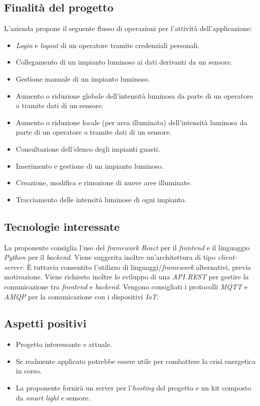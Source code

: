 \subsection{Finalità del progetto}
L’azienda propone il seguente flusso di operazioni per l’attività dell’applicazione:
\begin{itemize}
    \item \textit{Login} e \textit{logout} di un operatore tramite credenziali personali.
    \item Collegamento di un impianto luminoso ai dati derivanti da un sensore.
    \item Gestione manuale di un impianto luminoso.
    \item Aumento o riduzione globale dell’intensità luminosa da parte di un operatore o tramite dati di un sensore.
    \item Aumento o riduzione locale (per area illuminata) dell’intensità luminosa da parte di un operatore o tramite dati di un sensore.
    \item Consultazione dell’elenco degli impianti guasti.
    \item Inserimento e gestione di un impianto luminoso.
    \item Creazione, modifica e rimozione di nuove aree illuminate.
    \item Tracciamento delle intensità luminose di ogni impianto.
\end{itemize}

\subsection{Tecnologie interessate}
La proponente consiglia l'uso del \textit{framework React} per il \textit{frontend} e il linguaggio
\textit{Python} per il \textit{backend}.
Viene suggerita inoltre un'architettura di tipo \textit{client-server}.
È tuttavia consentito l'utilizzo di linguaggi/\textit{framework} alternativi, previa motivazione.
Viene richiesto inoltre lo sviluppo di una \textit{API REST} per gestire la comunicazione tra
\textit{frontend} e \textit{backend}.
Vengono consigliati i protocolli \textit{MQTT} e \textit{AMQP} per la comunicazione con i dispositivi \textit{IoT}.

\subsection{Aspetti positivi}
\begin{itemize}
    \item Progetto interessante e attuale.
    \item Se realmente applicato potrebbe essere utile per combattere la crisi energetica in corso.
    \item La proponente fornirà un server per l'\textit{hosting} del progetto e un kit composto da \textit{smart light} e sensore.
\end{itemize}

